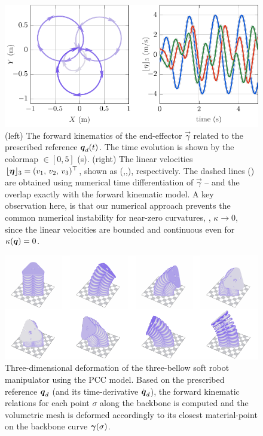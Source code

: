  \begin{figure}[!h]
  \pgfplotsset{colormap name=barney}
  \includegraphics*{./pdf/thesis-figure-4-5.pdf}
  \caption{(left) The forward kinematics of the end-effector $\vec{\gamma}$ related to the prescribed reference ${\boldsymbol{q}}_d(t)$. The time evolution is shown by the colormap \protect{}$\!\!\in [0,5]$ (s). (right) The linear velocities $\lfloor{\boldsymbol{\eta}}\rfloor_3 = (v_1,\,v_2,\,v_3)^\top$, shown as (,,), respectively. The dashed lines () are obtained using numerical time differentiation of $\vec{\gamma}$ -- and the overlap exactly with the forward kinematic model. A key observation here, is that our numerical approach prevents the common numerical instability for near-zero curvatures, \ie, $\kappa \to 0$, since the linear velocities are bounded and continuous even for $\kappa({\boldsymbol{q}}) = 0$. }
  \label{fig:C2:EX1:strain_ref_FK}
\end{figure}
\vfill

\begin{figure}[!h]
   \centering
   \includegraphics[width=.95\textwidth]{./pdf/thesis-figure-4-4.pdf}
   \caption{Three-dimensional deformation of the three-bellow soft robot manipulator using the PCC model. Based on the prescribed reference ${\boldsymbol{q}}_d$ (and its time-derivative ${\dot{\boldsymbol{q}}}_d$), the forward kinematic relations for each point $\sigma$ along the backbone is computed and the volumetric mesh is deformed accordingly to its closest material-point on the backbone curve ${\boldsymbol{\gamma}}(\sigma)$.}
   \vspace{-0.1cm}
   \label{fig:C2:EX1:strain_ref_3D}
 \end{figure}


